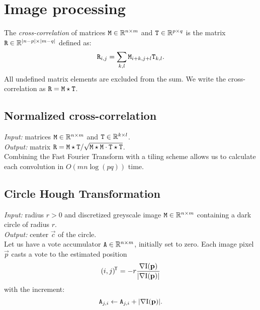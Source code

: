 \section{Image processing}

\begin{definition}
The \textit{cross-correlation} of matrices $\mathtt{M} \in \mathbb{R}^{n \times m}$ and $\mathtt{T} \in \mathbb{R}^{p \times q}$ is the matrix $\mathtt{R} \in \mathbb{R}^{|n-p| \times |m - q|}$ defined as:
$$\mathtt{R}_{i, j} = \sum_{k, l} \mathtt{M}_{i+k, j+l} \mathtt{T}_{k, l}.
$$
All undefined matrix elements are excluded from the sum.
We write the cross-correlation as $\mathtt{R} = \mathtt{M} \star \mathtt{T}$.
\end{definition}

\subsection{Normalized cross-correlation}

\textit{Input:} matrices $\mathtt{M} \in \mathbb{R}^{n \times m}$ and $\mathtt{T} \in \mathbb{R}^{k \times l}$.\\
\textit{Output:} matrix $\mathtt{R} = \mathtt{M} \star \mathtt{T} / \sqrt{ \mathtt{M} \star \mathtt{M} \cdot \mathtt{T} \star \mathtt{T}}$.\\


Combining the Fast Fourier Transform with a tiling scheme allows us to calculate each convolution in $O(mn \log(pq))$ time.

\subsection{Circle Hough Transformation}
\label{s:algo-hough}

\textit{Input:} radius $r > 0$ and discretized greyscale image $\mathtt{M} \in \mathbb{R}^{n \times m}$ containing a dark circle of radius $r$.\\
\textit{Output:} center $\vec c$ of the circle.\\

Let us have a vote accumulator $\mathtt{A} \in \mathbb{R}^{n \times m}$, initially set to zero.
Each image pixel $\vec p$ casts a vote to the estimated position
\begin{equation}
(i, j)^{\!\mathsf{T}} = -r \frac {\nabla \mathrm{I}(\mathbf{p})} {|\nabla \mathrm{I}(\mathbf{p})|}
\end{equation}
with the increment:
\begin{equation}
\mathtt{A}_{j, i} \leftarrow \mathtt{A}_{j, i} + |\nabla \mathrm{I}(\mathbf{p})|.
\end{equation}

